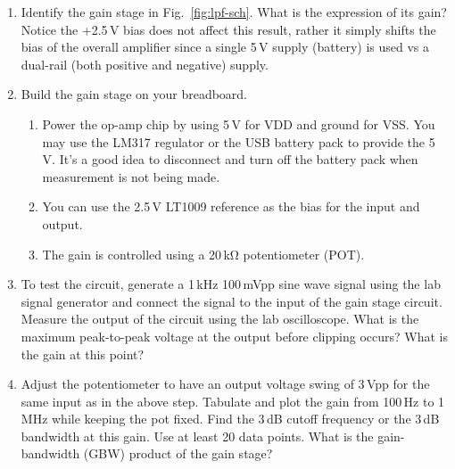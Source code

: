 \documentclass[letterpaper, 11pt]{article}
\begin{document}
\begin{enumerate}

	\item Identify the gain stage in Fig.~\ref{fig:lpf-sch}. What is the expression of its gain? Notice the +2.5\,V bias does not affect this result, rather it simply shifts the bias of the overall amplifier since a single 5\,V supply (battery) is used vs a dual-rail (both positive and negative) supply.
	
	\item Build the gain stage on your breadboard. 
		\begin{enumerate}
			\item Power the op-amp chip by using 5\,V for VDD and ground for VSS. You may use the LM317 regulator or the USB battery  pack to provide the 5\,V. It's a good idea to disconnect and turn off the battery pack when measurement is not being made.
			
			\item You can use the 2.5\,V LT1009 reference as the bias for the input and output. 
			
			\item The gain is controlled using a 20\,k\si{\ohm} potentiometer (POT). 			
		\end{enumerate}

	\item To test the circuit, generate a 1\,kHz 100\,mVpp sine wave signal using the lab signal generator and connect the signal to the input of the gain stage circuit. Measure the output of the circuit using the lab oscilloscope. What is the maximum peak-to-peak voltage at the output before clipping occurs? What is the gain at this point?
	
	\item Adjust the potentiometer to have an output voltage swing of 3\,Vpp for the same input as in the above step. 
	Tabulate and plot the gain from 100\,Hz to 1\,MHz while keeping the pot fixed. Find the 3\,dB cutoff frequency or the 3\,dB bandwidth at this gain. Use at least 20 data points. What is the gain-bandwidth (GBW) product of the gain stage? 
	

\end{enumerate}
\end{document}

